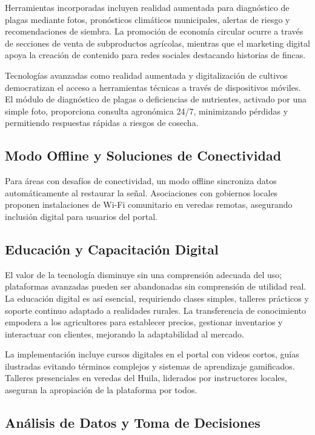 Herramientas incorporadas incluyen realidad aumentada para diagnóstico de plagas mediante fotos, pronósticos climáticos municipales, alertas de riesgo y recomendaciones de siembra. La promoción de economía circular ocurre a través de secciones de venta de subproductos agrícolas, mientras que el marketing digital apoya la creación de contenido para redes sociales destacando historias de fincas.

Tecnologías avanzadas como realidad aumentada y digitalización de cultivos democratizan el acceso a herramientas técnicas a través de dispositivos móviles. El módulo de diagnóstico de plagas o deficiencias de nutrientes, activado por una simple foto, proporciona consulta agronómica 24/7, minimizando pérdidas y permitiendo respuestas rápidas a riesgos de cosecha.
\subsection{Modo Offline y Soluciones de Conectividad}

Para áreas con desafíos de conectividad, un modo offline sincroniza datos automáticamente al restaurar la señal. Asociaciones con gobiernos locales proponen instalaciones de Wi-Fi comunitario en veredas remotas, asegurando inclusión digital para usuarios del portal.
\subsection{Educación y Capacitación Digital}

El valor de la tecnología disminuye sin una comprensión adecuada del uso; plataformas avanzadas pueden ser abandonadas sin comprensión de utilidad real. La educación digital es así esencial, requiriendo clases simples, talleres prácticos y soporte continuo adaptado a realidades rurales. La transferencia de conocimiento empodera a los agricultores para establecer precios, gestionar inventarios y interactuar con clientes, mejorando la adaptabilidad al mercado.

La implementación incluye cursos digitales en el portal con videos cortos, guías ilustradas evitando términos complejos y sistemas de aprendizaje gamificados. Talleres presenciales en veredas del Huila, liderados por instructores locales, aseguran la apropiación de la plataforma por todos.
\subsection{Análisis de Datos y Toma de Decisiones}

